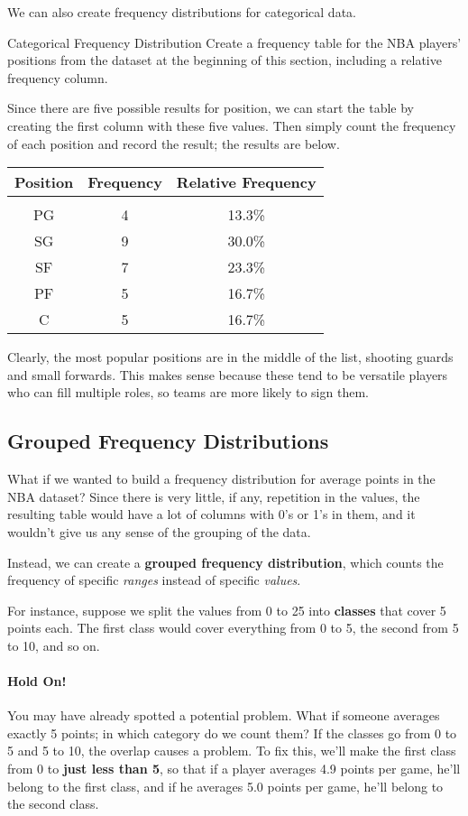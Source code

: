 We can also create frequency distributions for categorical data.

\begin{example}{Categorical Frequency Distribution}
Create a frequency table for the NBA players' positions from the dataset at the beginning of this section, including a relative frequency column.

\sol
Since there are five possible results for position, we can start the table by creating the first column with these five values.  Then simply count the frequency of each position and record the result; the results are below.
\begin{center}
\begin{tabular}{c c c}
\textbf{Position} & \textbf{Frequency} & \textbf{Relative Frequency}\\
\hline
& & \\
PG & 4 & 13.3\%\\
SG & 9 & 30.0\%\\
SF & 7 & 23.3\%\\
PF & 5 & 16.7\%\\
C & 5 & 16.7\%
\end{tabular}
\end{center}

Clearly, the most popular positions are in the middle of the list, shooting guards and small forwards.  This makes sense because these tend to be versatile players who can fill multiple roles, so teams are more likely to sign them.
\end{example}
\vfill

\subsection{Grouped Frequency Distributions}
What if we wanted to build a frequency distribution for average points in the NBA dataset?  Since there is very little, if any, repetition in the values, the resulting table would have a lot of columns with 0's or 1's in them, and it wouldn't give us any sense of the grouping of the data.

Instead, we can create a \textbf{grouped frequency distribution}, which counts the frequency of specific \emph{ranges} instead of specific \emph{values}.

For instance, suppose we split the values from 0 to 25 into \textbf{classes} that cover 5 points each.  The first class would cover everything from 0 to 5, the second from 5 to 10, and so on.
\vfill

\paragraph{Hold On!} You may have already spotted a potential problem.  What if someone averages exactly 5 points; in which category do we count them?  If the classes go from 0 to 5 and 5 to 10, the overlap causes a problem.  To fix this, we'll make the first class from 0 to \textbf{just less than 5}, so that if a player averages 4.9 points per game, he'll belong to the first class, and if he averages 5.0 points per game, he'll belong to the second class.

